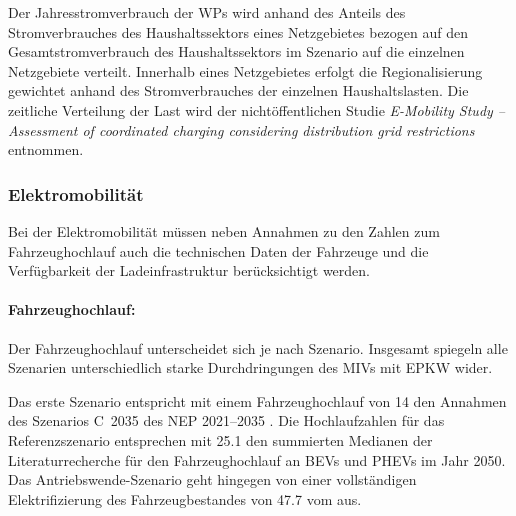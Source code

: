 

Der Jahresstromverbrauch der \glspl{WP} wird anhand des Anteils des Stromverbrauches des Haushaltssektors eines Netzgebietes bezogen auf den Gesamtstromverbrauch des Haushaltssektors im Szenario \ego auf die einzelnen Netzgebiete verteilt.
Innerhalb eines Netzgebietes erfolgt die Regionalisierung gewichtet anhand des Stromverbrauches der einzelnen Haushaltslasten.
Die zeitliche Verteilung der Last wird der nichtöffentlichen Studie \textit{E-Mobility Study {--} Assessment of coordinated charging considering distribution grid restrictions} \cite{Schachler} entnommen.


\subsubsection{Elektromobilität}\label{chap:EMob_Szenarien}

Bei der Elektromobilität müssen neben Annahmen zu den Zahlen zum Fahrzeughochlauf auch die technischen Daten der Fahrzeuge und die Verfügbarkeit der Ladeinfrastruktur berücksichtigt werden.


\paragraph{Fahrzeughochlauf:}
Der Fahrzeughochlauf unterscheidet sich je nach Szenario.
Insgesamt spiegeln alle Szenarien unterschiedlich starke Durchdringungen des \glspl{MIV} mit \gls{EPKW} wider.\medskip

Das erste Szenario entspricht mit einem Fahrzeughochlauf von \SI{14}{\MioStk} den Annahmen des Szenarios C~\num{2035} des \gls{NEP} \numrange[range-phrase=~{--}~]{2021}{2035} \cite{BNetzA2020}.
Die Hochlaufzahlen für das Referenzszenario entsprechen mit \SI{25.1}{\MioStk} den summierten Medianen der Literaturrecherche für den Fahrzeughochlauf an \glspl{BEV} und \glspl{PHEV} im Jahr \num{2050}.
Das Antriebswende-Szenario geht hingegen von einer vollständigen Elektrifizierung des Fahrzeugbestandes von \SI{47.7}{\MioStk} vom  \cite{KBA2020} aus.



